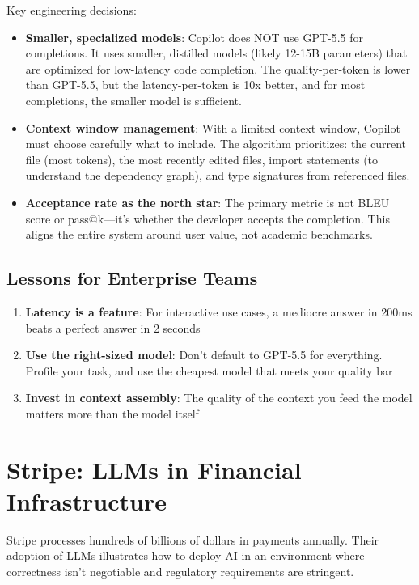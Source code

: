 Key engineering decisions:
\begin{itemize}[leftmargin=*]
    \item \textbf{Smaller, specialized models}: Copilot does NOT use GPT-5.5 for completions. It uses smaller, distilled models (likely 12-15B parameters) that are optimized for low-latency code completion. The quality-per-token is lower than GPT-5.5, but the latency-per-token is 10x better, and for most completions, the smaller model is sufficient.
    \item \textbf{Context window management}: With a limited context window, Copilot must choose carefully what to include. The algorithm prioritizes: the current file (most tokens), the most recently edited files, import statements (to understand the dependency graph), and type signatures from referenced files.
    \item \textbf{Acceptance rate as the north star}: The primary metric is not BLEU score or pass@k---it's whether the developer accepts the completion. This aligns the entire system around user value, not academic benchmarks.
\end{itemize}

\subsection{Lessons for Enterprise Teams}

\begin{enumerate}[leftmargin=*]
    \item \textbf{Latency is a feature}: For interactive use cases, a mediocre answer in 200ms beats a perfect answer in 2 seconds
    \item \textbf{Use the right-sized model}: Don't default to GPT-5.5 for everything. Profile your task, and use the cheapest model that meets your quality bar
    \item \textbf{Invest in context assembly}: The quality of the context you feed the model matters more than the model itself
\end{enumerate}

\section{Stripe: LLMs in Financial Infrastructure}

Stripe processes hundreds of billions of dollars in payments annually. Their adoption of LLMs illustrates how to deploy AI in an environment where correctness isn't negotiable and regulatory requirements are stringent.

